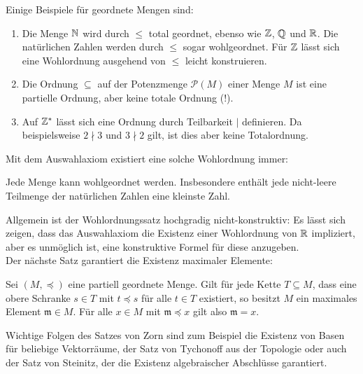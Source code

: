 \documentclass{book}
\begin{document}
\begin{exas} Einige Beispiele für geordnete Mengen sind:
	\begin{enumerate}
		\item Die Menge $\mathbb{N}$ wird durch $\leq$ total geordnet, ebenso wie $\mathbb{Z}$, $\mathbb{Q}$ und $\mathbb{R}$. Die natürlichen Zahlen werden durch $\leq$ sogar wohlgeordnet. Für $\mathbb{Z}$ lässt sich eine Wohlordnung ausgehend von $\leq$ leicht konstruieren.
		\item Die Ordnung $\subseteq$ auf der Potenzmenge $\mathcal{P}(M)$ einer Menge $M$ ist eine partielle Ordnung, aber keine totale Ordnung (!).
		\item Auf $\mathbb{Z}^\ast$ lässt sich eine Ordnung durch Teilbarkeit $\mid$ definieren. Da beispielsweise $2 \nmid 3$ und $3 \nmid 2$ gilt, ist dies aber keine Totalordnung.
	\end{enumerate}
\end{exas}

Mit dem Auswahlaxiom existiert eine solche Wohlordnung immer:

\begin{prop}[Wohlordnungssatz]
	Jede Menge kann wohlgeordnet werden. Insbesondere enthält jede nicht-leere Teilmenge der natürlichen Zahlen eine 			kleinste Zahl.
\end{prop}

Allgemein ist der Wohlordnungssatz hochgradig nicht-konstruktiv: Es lässt sich zeigen, dass das Auswahlaxiom die Existenz einer Wohlordnung von $\mathbb{R}$ impliziert, aber es unmöglich ist, eine konstruktive Formel für diese anzugeben.\\
Der nächste Satz garantiert die Existenz maximaler Elemente:
\begin{prop}
	Sei $(M, \preceq)$ eine partiell geordnete Menge. Gilt für jede Kette $T \subseteq M$, dass eine obere Schranke $s 	\in T$ mit $t \preceq s$ für alle $t \in T$ existiert, so besitzt $M$ ein maximales Element $\mathfrak{m} \in M$. 			Für alle $x \in M$ mit $\mathfrak{m} \preceq x$ gilt also $\mathfrak{m} = x$.
\end{prop}

Wichtige Folgen des Satzes von Zorn sind zum Beispiel die Existenz von Basen für beliebige Vektorräume, der Satz von Tychonoff aus der Topologie oder auch der Satz von Steinitz, der die Existenz algebraischer Abschlüsse garantiert.

\printindex
\end{document}

